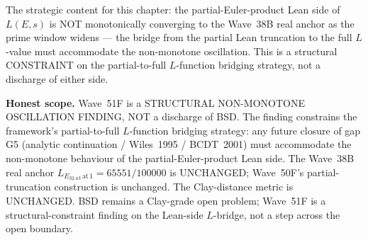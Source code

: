 \begin{remark}
\begin{itemize}
\end{itemize}
The strategic content for this chapter: the partial-Euler-product Lean side of $L(E, s)$ is NOT monotonically converging to the Wave~38B real anchor as the prime window widens --- the bridge from the partial Lean truncation to the full $L$-value must accommodate the non-monotone oscillation. This is a structural CONSTRAINT on the partial-to-full $L$-function bridging strategy, not a discharge of either side.

\textbf{Honest scope.} Wave~51F is a STRUCTURAL NON-MONOTONE OSCILLATION FINDING, NOT a discharge of BSD. The finding constrains the framework's partial-to-full $L$-function bridging strategy: any future closure of gap G5 (analytic continuation / Wiles~1995 / BCDT~2001) must accommodate the non-monotone behaviour of the partial-Euler-product Lean side. The Wave~38B real anchor $L_{E_{32.a3}\,\mathrm{at}\,1} = 65551/100000$ is UNCHANGED; Wave~50F's partial-truncation construction is unchanged. The Clay-distance metric is UNCHANGED. BSD remains a Clay-grade open problem; Wave~51F is a structural-constraint finding on the Lean-side $L$-bridge, not a step across the open boundary.
\end{remark}

